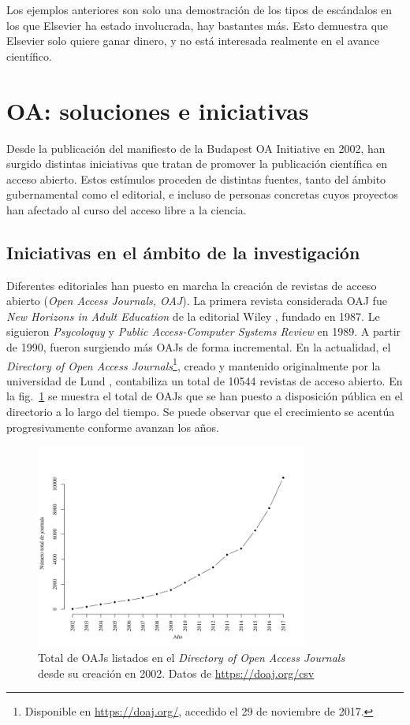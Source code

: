 Los ejemplos anteriores son solo una demostración de los tipos de escándalos en los que Elsevier ha estado involucrada, hay bastantes más. Esto demuestra que Elsevier solo quiere ganar dinero, y no está interesada realmente en el avance científico.

\section{OA: soluciones e iniciativas}\label{iniciativas}

Desde la publicación del manifiesto de la Budapest OA Initiative \cite{boai} en 2002, han surgido distintas iniciativas que tratan de promover la publicación científica en acceso abierto. Estos estímulos proceden de distintas fuentes, tanto del ámbito gubernamental como el editorial, e incluso de personas concretas cuyos proyectos han afectado al curso del acceso libre a la ciencia.

\subsection{Iniciativas en el ámbito de la investigación}

Diferentes editoriales han puesto en marcha la creación de revistas de acceso abierto (\textit{Open Access Journals, OAJ}). La primera revista considerada OAJ fue \textit{New Horizons in Adult Education} de la editorial Wiley \cite{earlyoaj}, fundado en 1987. Le siguieron \textit{Psycoloquy} y \textit{Public Access-Computer Systems Review} en 1989. A partir de 1990, fueron surgiendo más OAJs de forma incremental. En la actualidad, el \textit{Directory of Open Access Journals}\footnote{Disponible en \url{https://doaj.org/}, accedido el 29 de noviembre de 2017.}, creado y mantenido originalmente por la universidad de Lund \cite{nordic}, contabiliza un total de 10544 revistas de acceso abierto. En la fig.~\ref{fig:doaj} se muestra el total de OAJs que se han puesto a disposición pública en el directorio a lo largo del tiempo. Se puede observar que el crecimiento se acentúa progresivamente conforme avanzan los años.

\begin{figure}[htbp]
  \centering
  \includegraphics[width=0.8\textwidth]{doaj_years.png}
  \caption{\label{fig:doaj}Total de OAJs listados en el \textit{Directory of Open Access Journals} desde su creación en 2002. Datos de \url{https://doaj.org/csv}}

\end{figure}

